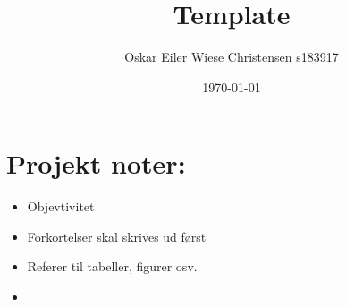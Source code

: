 \documentclass[11pt, fleqn]{article}
\title{Template}
\author{Oskar Eiler Wiese Christensen s183917}
\date{\today}
\begin{document}
	\maketitle
	\section*{Projekt noter:}
	\begin{itemize}
		\item Objevtivitet 
		\item Forkortelser skal skrives ud først
		\item Referer til tabeller, figurer osv. 
		\item 
	\end{itemize}
	
	
\end{document}
